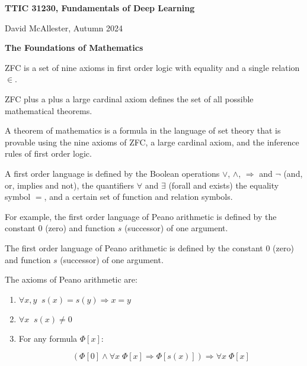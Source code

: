 




{\Huge

  \centerline{\bf TTIC 31230, Fundamentals of Deep Learning}

  
\bigskip

\centerline{David McAllester, Autumn  2024}


\vfill

\centerline{\bf The Foundations of Mathematics}


ZFC is a set of nine axioms in first order logic with equality and a single relation $\in$.

\vfill
ZFC plus a plus a large cardinal axiom defines the set of all possible mathematical theorems.

\vfill
A theorem of mathematics is a formula in the language of set theory that is provable using the nine axioms of ZFC, a large cardinal axiom,
and the inference rules of first order logic.


A first order language is defined by the Boolean operations $\vee$, $\wedge$, $\Rightarrow$ and $\neg$ (and, or, implies and not), the quantifiers $\forall$ and $\exists$ (forall and exists) the equality
symbol $=$, and a certain set of function and relation symbols.

\vfill
For example, the first order language of Peano arithmetic is defined by the constant $0$ (zero) and function $s$ (successor) of one argument.



The first order language of Peano arithmetic is defined by the constant $0$ (zero) and function $s$ (successor) of one argument.

\vfill
The axioms of Peano arithmetic are:

\vfill
\begin{enumerate}
\item $\forall x,y \;\;s(x)=s(y) \Rightarrow x=y$

\vfill
\item $\forall x\;\;s(x) \ne 0$

\vfill
\item For any formula $\Phi[x]$:

$$(\Phi[0] \wedge \forall x \;\Phi[x]\Rightarrow \Phi[s(x)]) \Rightarrow \forall x \;\Phi[x]$$
\end{enumerate}

}
